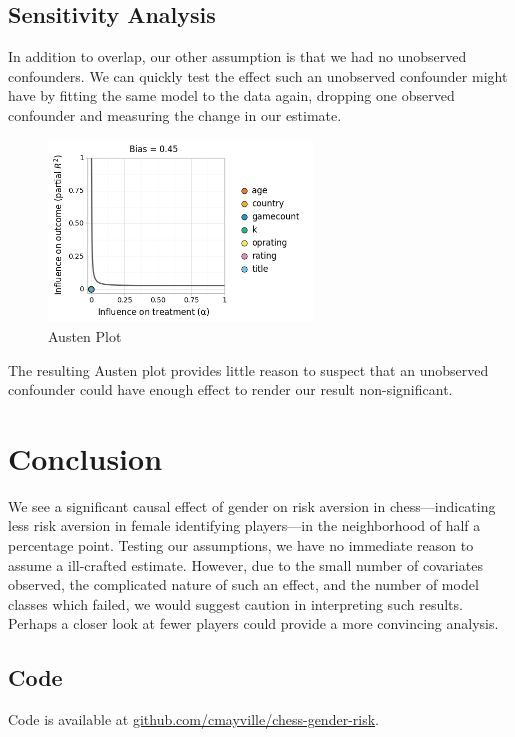 \documentclass[letterpaper, 11pt]{article}
\begin{document}
    \subsection*{Sensitivity Analysis}
        
        In addition to overlap, our other assumption is that we had no unobserved confounders.
        We can quickly test the effect such an unobserved confounder might have by fitting the same model to the data again, dropping one observed confounder and measuring the change in our estimate.
        
        \begin{figure}[H]
            \centering
            \includegraphics[width=7cm]{austen_plot.png}
            \caption{Austen Plot}
        \end{figure} 

        The resulting Austen plot provides little reason to suspect that an unobserved confounder could have enough effect to render our result non-significant.

    \section*{Conclusion}
        
        We see a significant causal effect of gender on risk aversion in chess---indicating less risk aversion in female identifying players---in the neighborhood of half a percentage point.
        Testing our assumptions, we have no immediate reason to assume a ill-crafted estimate.
        However, due to the small number of covariates observed, the complicated nature of such an effect, and the number of model classes which failed, we would suggest caution in interpreting such results.
        Perhaps a closer look at fewer players could provide a more convincing analysis.

    \subsection*{Code}
        
        Code is available at \href{https://github.com/cmayville/chess-gender-risk}{github.com/cmayville/chess-gender-risk}.



        



\nocite{lc0}
\newpage
\printbibliography
\end{document}
